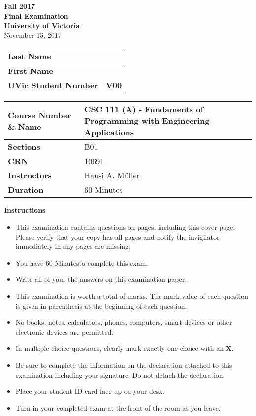 \documentclass[12pt]{exam}
\newcommand{\institution}{University of Victoria}
\newcommand{\course}{Fundaments of Programming with Engineering Applications}
\newcommand{\coursenumber}{CSC 111}
\newcommand{\courseid}{10691}
\newcommand{\sections}{B01}
\newcommand{\term}{Fall 2017}
\newcommand{\instructors}{Hausi A. M\"{u}ller}
\newcommand{\timelimit}{60 Minutes}
\newcommand{\examtitle}{Final Examination}
\newcommand{\examdate}{November 15, 2017}
\newcommand{\examversion}{A}
\begin{document}
\begin{center}
	{\LARGE\bfseries
		\term\\
		\examtitle\\
		\institution\\
	}
	\vspace{0.2cm}
	{\large \examdate}
\end{center}

\vspace{0.5cm}
\noindent
\renewcommand{\arraystretch}{3}
\begin{tabularx}{\textwidth}{|l|X|}
	\hline
	\textbf{Last Name} & \\
	\hline
	\textbf{First Name} & \\
	\hline
	\textbf{UVic Student Number} & \textbf{V00} \\
	\hline
\end{tabularx}

\vspace{1cm}
\noindent
\renewcommand{\arraystretch}{1.2}
\begin{tabularx}{\textwidth}{|l|X|}
	\hline
	\textbf{Course Number \& Name} & \coursenumber{} (\examversion) - \course \\
	\hline
	\textbf{Sections} & \sections \\
	\hline
	\textbf{CRN} & \courseid \\
	\hline
	\textbf{Instructors} & \instructors \\
	\hline
	\textbf{Duration} & \timelimit \\
	\hline
\end{tabularx}
\renewcommand{\arraystretch}{1}

\vspace{1cm}
\noindent
{\large\bfseries Instructions}
{\small
	\begin{itemize}[noitemsep]
		\item This examination contains \numquestions{} questions on \numpages{} pages, including this cover page. Please verify that your copy has all pages and notify the invigilator immediately in any pages are missing.
		\item You have \timelimit to complete this exam.
		\item Write all of your the answers on this examination paper.
		\item This examination is worth a total of \numpoints{} marks. The mark value of each question is given in parenthesis at the beginning of each question.
		\item No books, notes, calculators, phones, computers, smart devices or other electronic devices are permitted.
		\item In multiple choice questions, clearly mark exactly one choice with an \textbf{X}.
		\item Be sure to complete the information on the declaration attached to this examination including your signature. Do not detach the declaration.
		\item Place your student ID card face up on your desk.
		\item Turn in your completed exam at the front of the room as you leave.
	\end{itemize}
}
\clearpage
\end{document}
